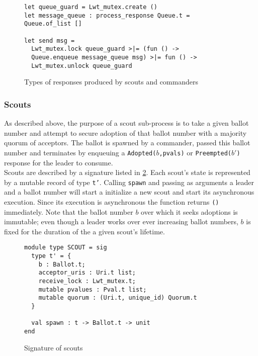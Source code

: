 \begin{figure}
  \begin{lstlisting}
let queue_guard = Lwt_mutex.create ()
let message_queue : process_response Queue.t = Queue.of_list []

let send msg = 
  Lwt_mutex.lock queue_guard >|= (fun () ->
  Queue.enqueue message_queue msg) >|= fun () ->
  Lwt_mutex.unlock queue_guard
  \end{lstlisting}
  \caption{Types of responses produced by scouts and commanders}
  \label{fig:sub-process-messaging-queue}
\end{figure}

\subsubsection{Scouts}

As described above, the purpose of a scout sub-process is to take a given ballot number and attempt to secure adoption of that ballot number with a majority quorum of acceptors. The ballot is spawned by a commander, passed this ballot number and terminates by enqueuing a \texttt{Adopted($b$,pvals)} or \texttt{Preempted($b'$)} response for the leader to consume. \\

Scouts are described by a signature listed in \ref{fig:scout-sig}. Each scout's state is represented by a mutable record of type \texttt{t'}. Calling \texttt{spawn} and passing as arguments a leader and a ballot number will start a initialize a new scout and start its asynchronous execution. Since its execution is asynchronous the function returns \texttt{()} immediately. Note that the ballot number $b$ over which it seeks adoptions is immutable; even though a leader works over ever increasing ballot numbers, $b$ is fixed for the duration of the a given scout's lifetime.  \\

\begin{figure}
  \begin{lstlisting}
module type SCOUT = sig
  type t' = {
    b : Ballot.t;
    acceptor_uris : Uri.t list;
    receive_lock : Lwt_mutex.t;  
    mutable pvalues : Pval.t list;
    mutable quorum : (Uri.t, unique_id) Quorum.t
  }

  val spawn : t -> Ballot.t -> unit
end
  \end{lstlisting}
  \centering
  \caption{Signature of scouts}
  \label{fig:scout-sig}
\end{figure}

